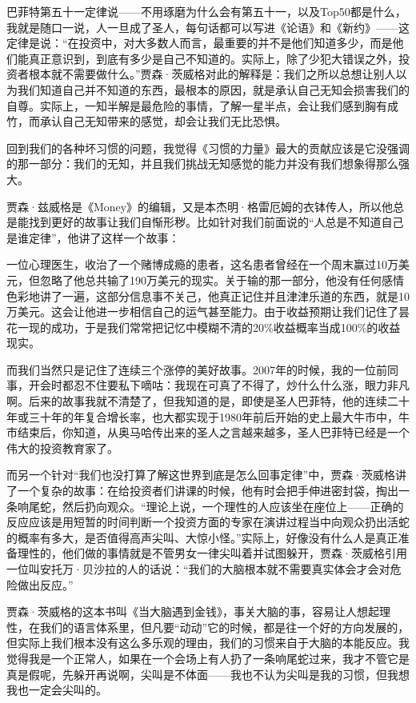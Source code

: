 巴菲特第五十一定律说------不用琢磨为什么会有第五十一，以及Top50都是什么，我就是随口一说，人一旦成了圣人，每句话都可以写进《论语》和《新约》------这定律是说：``在投资中，对大多数人而言，最重要的并不是他们知道多少，而是他们能真正意识到，到底有多少是自己不知道的。实际上，除了少犯大错误之外，投资者根本就不需要做什么。''贾森·茨威格对此的解释是：我们之所以总想让别人以为我们知道自己并不知道的东西，最根本的原因，就是承认自己无知会损害我们的自尊。实际上，一知半解是最危险的事情，了解一星半点，会让我们感到胸有成竹，而承认自己无知带来的感觉，却会让我们无比恐惧。

回到我们的各种坏习惯的问题，我觉得《习惯的力量》最大的贡献应该是它没强调的那一部分：我们的无知，并且我们挑战无知感觉的能力并没有我们想象得那么强大。

贾森·兹威格是《Money》的编辑，又是本杰明·格雷厄姆的衣钵传人，所以他总是能找到更好的故事让我们自惭形秽。比如针对我们前面说的``人总是不知道自己是谁定律''，他讲了这样一个故事：

一位心理医生，收治了一个赌博成瘾的患者，这名患者曾经在一个周末赢过10万美元，但忽略了他总共输了190万美元的现实。关于输的那一部分，他没有任何感情色彩地讲了一遍，这部分信息事不关己，他真正记住并且津津乐道的东西，就是10万美元。这会让他进一步相信自己的运气甚至能力。由于收益预期让我们记住了昙花一现的成功，于是我们常常把记忆中模糊不清的20\%收益概率当成100\%的收益现实。

而我们当然只是记住了连续三个涨停的美好故事。2007年的时候，我的一位前同事，开会时都忍不住要私下嘀咕：我现在可真了不得了，炒什么什么涨，眼力非凡啊。后来的故事我就不清楚了，但我知道的是，即使是圣人巴菲特，他的连续二十年或三十年的年复合增长率，也大都实现于1980年前后开始的史上最大牛市中，牛市结束后，你知道，从奥马哈传出来的圣人之言越来越多，圣人巴菲特已经是一个伟大的投资教育家了。

而另一个针对``我们也没打算了解这世界到底是怎么回事定律''中，贾森·茨威格讲了一个复杂的故事：在给投资者们讲课的时候，他有时会把手伸进密封袋，掏出一条响尾蛇，然后扔向观众。``理论上说，一个理性的人应该坐在座位上------正确的反应应该是用短暂的时间判断一个投资方面的专家在演讲过程当中向观众扔出活蛇的概率有多大，是否值得高声尖叫、大惊小怪。''实际上，好像没有什么人是真正准备理性的，他们做的事情就是不管男女一律尖叫着并试图躲开，贾森·茨威格引用一位叫安托万·贝沙拉的人的话说：``我们的大脑根本就不需要真实体会才会对危险做出反应。''

贾森·茨威格的这本书叫《当大脑遇到金钱》，事关大脑的事，容易让人想起理性，在我们的语言体系里，但凡要``动动''它的时候，都是往一个好的方向发展的，但实际上我们根本没有这么多乐观的理由，我们的习惯来自于大脑的本能反应。我觉得我是一个正常人，如果在一个会场上有人扔了一条响尾蛇过来，我才不管它是真是假呢，先躲开再说啊，尖叫是不体面------我也不认为尖叫是我的习惯，但我想我也一定会尖叫的。

